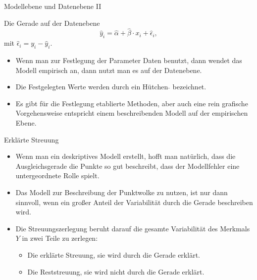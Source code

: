 \documentclass[usenames,dvipsnames,handout]{beamer}
\begin{document}
\begin{frame}{Modellebene und Datenebene II}
\begin{block}{Die Gerade auf der  Datenebene}
$$
\hat{y}_{i} = \hat{\alpha} + \hat{\beta} \cdot x_{i} + \hat{\epsilon}_{i},
$$
mit $\hat{\epsilon}_{i}= y_{i}-\hat{y}_{i}.$
\end{block}
\begin{itemize}
\item{Wenn man zur Festlegung der Parameter
Daten benutzt, dann wendet das Modell empirisch an,
dann nutzt man es auf der   Datenebene.
}\pause
\item{Die Festgelegten Werte werden durch ein Hütchen $\hat{}$
bezeichnet.}\pause
\item{Es gibt für die Festlegung etablierte Methoden,
aber auch eine rein grafische Vorgehensweise entspricht
einem beschreibenden Modell auf der empirischen Ebene.}
\end{itemize}
\end{frame}

\begin{frame}{Erklärte Streuung}
\begin{itemize}
\item{Wenn man ein deskriptives Modell erstellt, hofft man natürlich, dass die Ausgleichsgerade
die Punkte so gut beschreibt, dass der Modellfehler eine untergeordnete Rolle spielt.}\pause
\item{Das Modell zur Beschreibung der Punktwolke zu nutzen, ist nur dann
sinnvoll, wenn ein großer Anteil der Variabilität durch die Gerade beschreiben wird.}\pause
\item{Die Streuungszerlegung beruht darauf die gesamte Variabilität des Merkmals
$Y$ in zwei Teile zu zerlegen:}\pause
\begin{itemize}
\item{Die erklärte Streuung, sie wird durch die Gerade erklärt.}\pause
\item{Die Reststreuung, sie wird nicht durch die Gerade erklärt.}
\end{itemize}
\end{itemize}
\end{frame}
\end{document}
